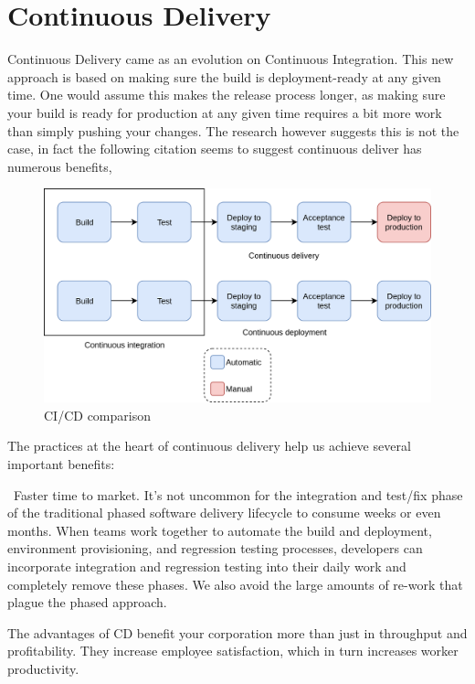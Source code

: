 \section{Continuous Delivery}
Continuous Delivery came as an evolution on Continuous Integration. This new approach is based on making sure the build is deployment-ready at any given time. One would assume this makes the release process longer, as making sure your build is ready for production at any given time requires a bit more work than simply pushing your changes. The research however suggests this is not the case, in fact the following citation seems to suggest continuous deliver has numerous benefits,

\begin{figure}[h!]
  \includegraphics[width=\linewidth,height=\textheight,keepaspectratio]{images/ci_cd_comparison.png}
  \caption{CI/CD comparison}
  \label{fig:CI/CD-comparison}
\end{figure}

\begin{displayquote}
    The practices at the heart of continuous delivery help us achieve several important benefits:
    
    \textbullet ~Faster time to market. It’s not uncommon for the integration and test/fix phase of the traditional phased software delivery lifecycle to consume weeks or even months. When teams work together to automate the build and deployment, environment provisioning, and regression testing processes, developers can incorporate integration and regression testing into their daily work and completely remove these phases. We also avoid the large amounts of re-work that plague the phased approach\cite{continuousdeliveryfaster}.
\end{displayquote}

The advantages of \acrshort{CD} benefit your corporation more than just in throughput and profitability. They increase employee satisfaction, which in turn increases worker productivity\cite{happy}.

